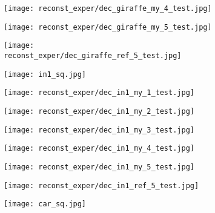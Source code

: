 \begin{figure}[H]
\begin{subfigure}[b]{0.13\linewidth}
	\end{subfigure}
	\begin{subfigure}[b]{0.13\linewidth}
		\texttt{[image: reconst\_exper/dec\_giraffe\_my\_4\_test.jpg]} %
	\end{subfigure}
	\begin{subfigure}[b]{0.13\linewidth}
		\texttt{[image: reconst\_exper/dec\_giraffe\_my\_5\_test.jpg]} %
	\end{subfigure}
	\begin{subfigure}[b]{0.13\linewidth}
		\texttt{[image: reconst\_exper/dec\_giraffe\_ref\_5\_test.jpg]} %
	\end{subfigure}
	\centering
	\begin{subfigure}[b]{0.13\linewidth}
		\texttt{[image: in1\_sq.jpg]} %
	\end{subfigure}
	\begin{subfigure}[b]{0.13\linewidth}
		\texttt{[image: reconst\_exper/dec\_in1\_my\_1\_test.jpg]} %
	\end{subfigure}
	\begin{subfigure}[b]{0.13\linewidth}
		\texttt{[image: reconst\_exper/dec\_in1\_my\_2\_test.jpg]} %
	\end{subfigure}
	\begin{subfigure}[b]{0.13\linewidth}
		\texttt{[image: reconst\_exper/dec\_in1\_my\_3\_test.jpg]} %
	\end{subfigure}
	\begin{subfigure}[b]{0.13\linewidth}
		\texttt{[image: reconst\_exper/dec\_in1\_my\_4\_test.jpg]} %
	\end{subfigure}
	\begin{subfigure}[b]{0.13\linewidth}
		\texttt{[image: reconst\_exper/dec\_in1\_my\_5\_test.jpg]} %
	\end{subfigure}
	\begin{subfigure}[b]{0.13\linewidth}
		\texttt{[image: reconst\_exper/dec\_in1\_ref\_5\_test.jpg]} %
	\end{subfigure}
	\centering
	\begin{subfigure}[b]{0.13\linewidth}
		\texttt{[image: car\_sq.jpg]} %

\end{subfigure}
\end{figure}
